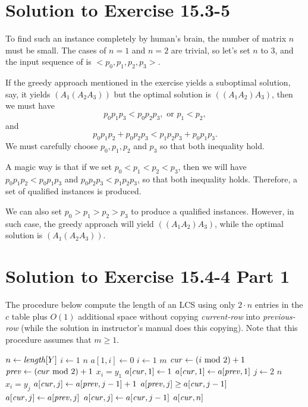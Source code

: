 \documentclass[a4paper, fleqn]{article}
\begin{document}
\section*{Solution to Exercise 15.3-5}

To find such an instance completely by human's brain, the number of
matrix $n$ must be small. The cases of $n = 1$ and $n = 2$ are
trivial, so let's set $n$ to 3, and the input sequence of
 is $<p_0, p_1, p_2, p_3>$.

If the greedy approach mentioned in the exercise yields a suboptimal
solution, say, it yields $(A_1 (A_2 A_3))$ but the optimal solution is
$((A_1 A_2) A_3)$, then we must have
\[
p_0 p_1 p_3 < p_0 p_2 p_3, \mbox{ or } p_1 < p_2,
\]
and
\[
p_0 p_1 p_2 + p_0 p_2 p_3 < p_1 p_2 p_3 + p_0 p_1 p_3.
\]
We must carefully choose $p_0, p_1, p_2$ and $p_3$ so that both
inequality hold.

A magic way is that if we set $p_0 < p_1 < p_2 < p_3$, then we will
have $p_0 p_1 p_2 < p_0 p_1 p_3$ and $p_0 p_2 p_3 < p_1 p_2 p_3$, so
that both inequality holds. Therefore, a set of qualified instances
is produced.

We can also set $p_0 > p_1 > p_2 > p_3$ to produce a qualified
instances. However, in such case, the greedy approach will yield
$((A_1 A_2) A_3)$, while the optimal solution is $(A_1 (A_2 A_3))$.






\section*{Solution to Exercise 15.4-4 Part 1}

The procedure below compute the length of an LCS using only $2 \cdot
n$ entries in the $c$ table plus $O(1)$ additional space without
copying \textit{current-row} into \textit{previous-row} (while the
solution in instructor's manual does this copying). Note that this
procedure assumes that $m \geq 1$.

\begin{codebox}
\li $n \gets \id{length}[Y]$
\li \For $i \gets 1$ \To $n$
\li   \Do $a[1,i] \gets 0$
      \End
\li \For $i \gets 1$ \To $m$
\li   \Do
        $\id{cur} \gets (i \mbox{ mod } 2) + 1$
\li     $\id{prev} \gets (cur \mbox{ mod } 2) + 1$
\li     \If $x_i = y_1$
\li       \Then $a[\id{cur}, 1] \gets 1$
\li       \Else $a[\id{cur}, 1] \gets a[\id{prev}, 1]$
          \End
\li     \For $j \gets 2$ \To $n$
\li       \Do
            \If $x_i = y_j$
\li           \Then $a[\id{cur}, j] \gets a[\id{prev}, j-1] + 1$
\li         \ElseIf $a[\id{prev}, j] \geq a[\id{cur}, j-1]$
\li           \Then $a[\id{cur}, j] \gets a[\id{prev}, j]$
\li         \ElseNoIf $a[\id{cur}, j] \gets a[\id{cur}, j-1]$
              \End
          \End
      \End
\li \Return $a[\id{cur}, n]$
\end{codebox}
\end{document}
